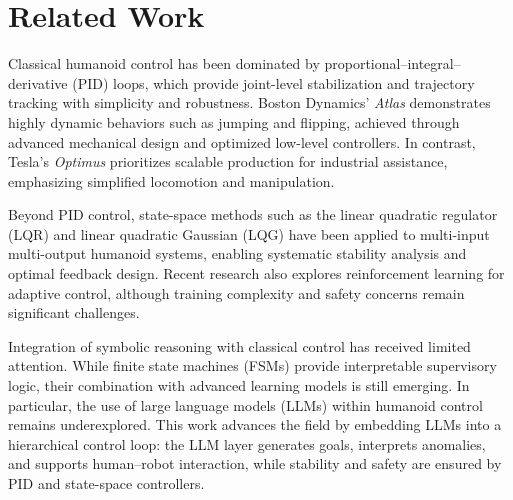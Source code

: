 \section{Related Work}
Classical humanoid control has been dominated by proportional–integral–derivative (PID) loops,
which provide joint-level stabilization and trajectory tracking with simplicity and robustness.
Boston Dynamics’ \textit{Atlas} demonstrates highly dynamic behaviors such as jumping and flipping,
achieved through advanced mechanical design and optimized low-level controllers.
In contrast, Tesla’s \textit{Optimus} prioritizes scalable production for industrial assistance,
emphasizing simplified locomotion and manipulation.

Beyond PID control, state-space methods such as the linear quadratic regulator (LQR)
and linear quadratic Gaussian (LQG) have been applied to multi-input multi-output humanoid systems,
enabling systematic stability analysis and optimal feedback design.
Recent research also explores reinforcement learning for adaptive control,
although training complexity and safety concerns remain significant challenges.

Integration of symbolic reasoning with classical control has received limited attention.
While finite state machines (FSMs) provide interpretable supervisory logic,
their combination with advanced learning models is still emerging.
In particular, the use of large language models (LLMs) within humanoid control
remains underexplored. This work advances the field by embedding LLMs
into a hierarchical control loop: the LLM layer generates goals,
interprets anomalies, and supports human–robot interaction,
while stability and safety are ensured by PID and state-space controllers.
